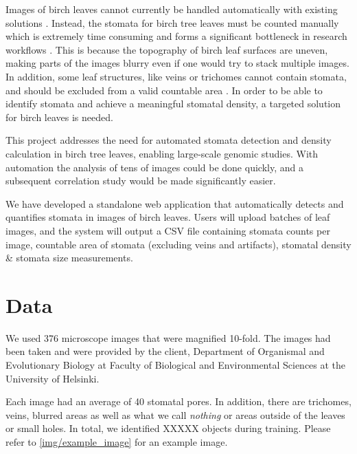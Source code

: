 \documentclass[a4paper,12pt,bibliography=totoc,numbers=noenddot,sfdefaults=false,abstract=true,notitlepage]{scrartcl} %
\begin{document}
	Images of birch leaves cannot currently be handled automatically with existing solutions \autocite{saiStomaAIEfficientUserfriendly2023}. Instead, the stomata for birch tree leaves must be counted manually which is extremely time consuming and forms a significant bottleneck in research workflows \autocite{saiStomaAIEfficientUserfriendly2023, gibbsApplicationDeepLearning2024}. This is because the topography of birch leaf surfaces are uneven, making parts of the images blurry even if one would try to stack multiple images. In addition, some leaf structures, like veins or trichomes cannot contain stomata, and should be excluded from a valid countable area \autocite{valkamaComparativeAnalysisLeaf2003}. In order to be able to identify stomata and achieve a meaningful stomatal density, a targeted solution for birch leaves is needed.
	
	This project addresses the need for automated stomata detection and density calculation in birch tree leaves, enabling large-scale genomic studies. With automation the analysis of tens of images could be done quickly, and a subsequent correlation study would be made significantly easier.
	
	We have developed a standalone web application that automatically detects and quantifies stomata in images of birch leaves. Users will upload batches of leaf images, and the system will output a CSV file containing stomata counts per image, countable area of stomata (excluding veins and artifacts), stomatal density & stomata size measurements. 
	
	
	
	
	\section{Data}\label{data}
	
	We used 376 microscope images that were magnified 10-fold. The images had been taken and were provided by the client, Department of Organismal and Evolutionary Biology at 
	Faculty of Biological and Environmental Sciences  at the University of Helsinki.
	
	Each image had an average of 40 stomatal pores. In addition, there are trichomes, veins, blurred areas as well as what we call \emph{nothing} \textemdash or areas outside of the leaves or small holes. In total, we identified XXXXX objects during training. Please refer to \autoref{img/example_image} for an example image.
	
\end{document}
